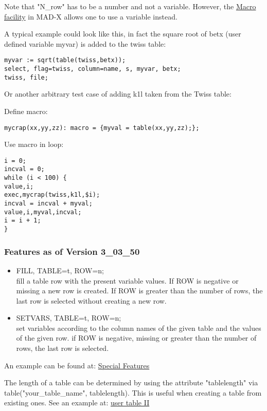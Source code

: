Note that "N\_row" has to be a number and not a  variable. However, the
\href{../control/special.html#macro}{Macro facility} in MAD-X  allows
one to use a variable instead.   

A typical example could look like this, in fact the square root of betx
(user defined variable myvar) is added to the twiss table:  
\begin{verbatim}
myvar := sqrt(table(twiss,betx));
select, flag=twiss, column=name, s, myvar, betx;
twiss, file;
\end{verbatim}

Or another arbitrary test case of adding k1l taken from the Twiss table: 

Define macro: 
\begin{verbatim}
mycrap(xx,yy,zz): macro = {myval = table(xx,yy,zz);};
\end{verbatim}

Use macro in loop: 
\begin{verbatim}
i = 0;
incval = 0;
while (i < 100) {
value,i;
exec,mycrap(twiss,k1l,$i);
incval = incval + myval;
value,i,myval,incval;                
i = i + 1;
}
\end{verbatim}

\subsubsection{Features as of Version 3\_03\_50}

\begin{itemize}
  \item  FILL, TABLE=t, ROW=n; \\
    fill a table row with the present variable values. If ROW is
    negative or missing a new row is created. If ROW is greater than the
    number of rows, the last row is selected without creating a new row.  

  \item SETVARS, TABLE=t, ROW=n; \\
    set variables according to the column names of the given table and
    the values of the given row. if ROW is negative, missing or greater
    than the number of rows, the last row is selected. 
\end{itemize}

An example can be found at:
\href{http://cern.ch/frs/mad-X_examples/special_features}{Special
  Features} 

The length of a table can be determined by using the attribute
"tablelength" via table("your\_table\_name", tablelength). This is
useful when creating a table from existing ones. See an example at:
\href{../Introduction/select.html#screate}{user table II} 


